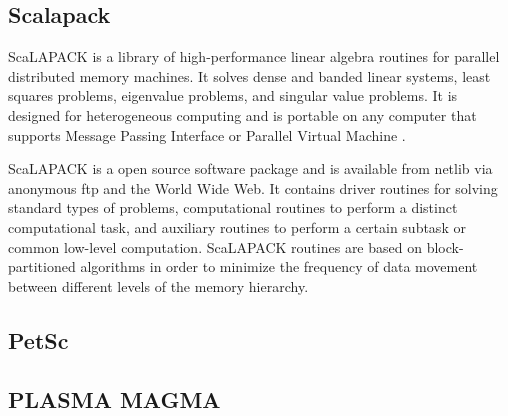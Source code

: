 \subsection{Scalapack}

    ScaLAPACK is a library of high-performance linear algebra routines for
    parallel distributed memory machines. It solves dense and banded
    linear systems, least squares problems, eigenvalue problems, and
    singular value problems. It is designed for heterogeneous computing
    and is portable on any computer that supports Message Passing
    Interface or Parallel Virtual Machine \cite{www-scalapack}.

    ScaLAPACK is a open source software package and is available from
    netlib via anonymous ftp and the World Wide Web. It contains driver
    routines for solving standard types of problems, computational
    routines to perform a distinct computational task, and auxiliary
    routines to perform a certain subtask or common low-level
    computation. ScaLAPACK routines are based on block-partitioned
    algorithms in order to minimize the frequency of data movement between
    different levels of the memory hierarchy.
    
\subsection{PetSc}
\subsection{PLASMA MAGMA}

